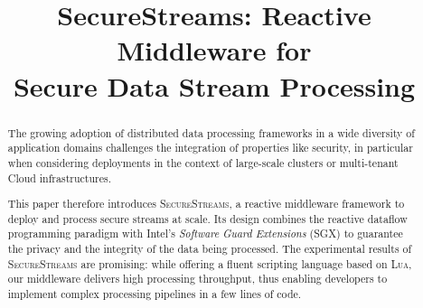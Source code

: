\documentclass{sig-alternate}
\newcommand{\SYS}{\textsc{SecureStreams}\xspace}
\begin{document}
\title{SecureStreams: Reactive Middleware for\\Secure Data Stream Processing}
\date{}

\author{
}

\maketitle


\begin{abstract}
The growing adoption of distributed data processing frameworks in a wide diversity of application domains challenges the integration of properties like security, in particular when considering deployments in the context of large-scale clusters or multi-tenant Cloud infrastructures.

This paper therefore introduces \SYS, a reactive middleware framework to deploy and process secure streams at scale.
Its design combines the reactive dataflow programming paradigm with Intel's \emph{Software Guard Extensions} (SGX) to guarantee the privacy and the integrity of the data being processed.
The experimental results of \SYS are promising: while offering a fluent scripting language based on \textsc{Lua}, our middleware delivers high processing throughput, thus enabling developers to implement complex processing pipelines in a few lines of code.
\end{abstract}













\end{document}
